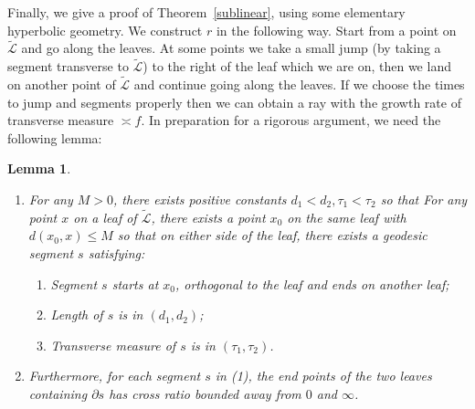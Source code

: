 \documentclass[11pt]{article} %
\theoremstyle{plain}
\newtheorem{lm}[thm]{Lemma}
\theoremstyle{definition}
\numberwithin{equation}{section}
\begin{document}
Finally, we give a proof of Theorem~\ref{sublinear}, using some elementary hyperbolic geometry. We construct $r$ in the following way. Start from a point on $\tilde{\mathcal{L}}$ and go along the leaves. At some points we take a small jump (by taking a segment transverse to $\tilde{\mathcal{L}}$) to the right of the leaf which we are on, then we land on another point of $\tilde{\mathcal{L}}$ and continue going along the leaves. If we choose the times to jump and segments properly then we can obtain a ray with the growth rate of transverse measure $\asymp f$. In preparation for a rigorous argument, we need the following lemma:
\begin{lm}\label{lm:jump}
\begin{enumerate}[label=\normalfont{(\arabic*)}, topsep=0mm, itemsep=0mm]
    \item\label{item: constants} For any $M>0$, there exists positive constants $d_1<d_2,\tau_1<\tau_2$ so that For any point $x$ on a leaf of $\tilde{\mathcal{L}}$, there exists a point $x_0$ on the same leaf with $d(x_0,x)\le M$ so that on either side of the leaf, there exists a geodesic segment $s$ satisfying:
    \begin{enumerate}[label=\normalfont{(\alph*)}, topsep=0mm, itemsep=0mm]
        \item Segment $s$ starts at $x_0$, orthogonal to the leaf and ends on another leaf;
        \item Length of $s$ is in $(d_1,d_2)$;
        \item Transverse measure of $s$ is in $(\tau_1,\tau_2)$.
    \end{enumerate}
    \item\label{item: cross_ratio} Furthermore, for each segment $s$ in \emph{(1)}, the end points of the two leaves containing $\partial s$ has cross ratio bounded away from $0$ and $\infty$.
\end{enumerate}
\end{lm}
\end{document}

